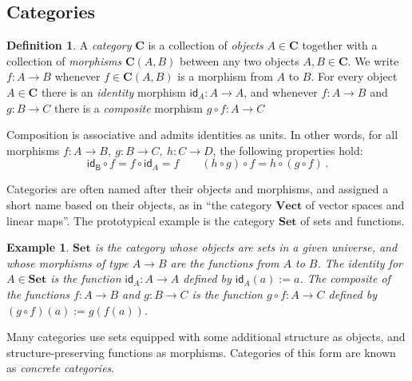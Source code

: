 \documentclass[11pt,oneside,draft]{book}
\newtheorem{example}[theorem]{Example}
\theoremstyle{definition}
\newtheorem{definition}[theorem]{Definition}
\newcommand{\kw}[1]{\ensuremath{ \mathsf{#1} }}
\begin{document}
\subsection{Categories} %

\begin{definition} %
A \emph{category} $\mathbf{C}$
is a collection of \emph{objects} $A \in \mathbf{C}$
together with a collection of \emph{morphisms} $\mathbf{C}(A,B)$
between any two objects $A, B \in \mathbf{C}$.
We write $f : A \rightarrow B$
whenever $f \in \mathbf{C}(A,B)$ is a morphism from $A$ to $B$.
For every object $A \in \mathbf{C}$
there is an \emph{identity} morphism $\kw{id}_A : A \rightarrow A$,
and whenever $f : A \rightarrow B$ and $g : B \rightarrow C$
there is a \emph{composite} morphism $g \circ f : A \rightarrow C$

Composition is associative
and admits identities as units.
In other words,
for all morphisms
$f : A \rightarrow B, \:
 g : B \rightarrow C, \:
 h : C \rightarrow D$,
the following properties hold:
\[
  \kw{id_B} \circ f = f \circ \kw{id}_A = f
  \qquad
  (h \circ g) \circ f = h \circ (g \circ f)
  \,.
\]
\end{definition}

Categories are often named after their objects and morphisms,
and assigned a short name based on their objects,
as in ``the category $\mathbf{Vect}$ of vector spaces and linear maps''.
The prototypical example is the category $\mathbf{Set}$
of sets and functions.

\begin{example} \label{ex:set} %
$\mathbf{Set}$ is the category whose objects are sets in a given universe,
and whose morphisms of type $A \rightarrow B$
are the functions from $A$ to $B$.
The identity for $A \in \mathbf{Set}$
is the function $\kw{id}_A : A \rightarrow A$
defined by $\kw{id}_A(a) := a$.
The composite of the functions $f : A \rightarrow B$ and
$g : B \rightarrow C$
is the function $g \circ f : A \rightarrow C$
defined by $(g \circ f)(a) := g(f(a))$.
\end{example}

Many categories use
sets equipped with some additional structure as objects,
and structure-preserving functions as morphisms.
Categories of this form are known as \emph{concrete categories}.
\end{document}
